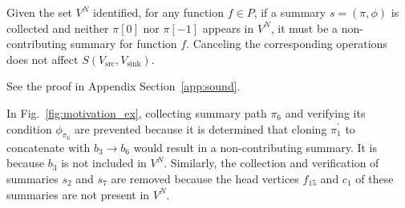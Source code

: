 \begin{theorem}[Soundness]
\label{thm:sound}

Given the set $V^{N}$ identified, for any function $f \in P$, if a summary $s=(\pi, \phi)$ is collected and neither $\pi[0]$ nor $\pi[-1]$ appears in $V^{N}$, it must be a non-contributing summary for function $f$. Canceling the corresponding operations does not affect $S(V_{\text{src}}, V_{\text{sink}})$.

See the proof in Appendix Section~\ref{app:sound}.

\end{theorem}

\begin{example}
In Fig.~\ref{fig:motivation_ex}, collecting summary path $\pi_{6}$ and verifying its condition $\phi_{\pi_{6}}$ are prevented because it is determined that cloning $\pi_{1}^{\prime}$ to concatenate with $b_3 \rightarrow b_6$ would result in a non-contributing summary.
It is because $b_3$ is not included in $V^{N}$.
Similarly, the collection and verification of summaries $s_{2}$ and $s_7$ are removed because the head vertices $f_{15}$ and $c_1$ of these summaries are not present in $V^{N}$.
\end{example}

